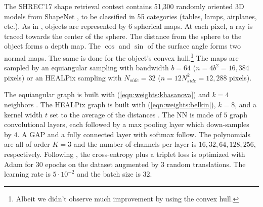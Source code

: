 \documentclass{article} %
\newcommand{\eqnref}[1]{(\ref{eqn:#1})}
\begin{document}
The SHREC'17 shape retrieval contest \citep{shrec17} contains 51,300 randomly oriented 3D models from ShapeNet \citep{shapenet}, to be classified in 55 categories (tables, lamps, airplanes, etc.).
As in \citep{cohen2018sphericalcnn}, objects are represented by 6 spherical maps.
At each pixel, a ray is traced towards the center of the sphere.
The distance from the sphere to the object forms a depth map.
The $\cos$ and $\sin$ of the surface angle forms two normal maps.
The same is done for the object's convex hull.\footnote{Albeit we didn't observe much improvement by using the convex hull.}
The maps are sampled by an equiangular sampling with bandwidth $b = 64$ ($n = 4 b^2 = 16,384$ pixels) or an HEALPix sampling with $N_{side} = 32$ ($n = 12 N_{side}^2 = 12,288$ pixels).

The equiangular graph is built with \eqnref{weights:khasanova} and $k = 4$ neighbors \citep[following][]{khasanova2017sphericalcnn}.
The HEALPix graph is built with \eqnref{weights:belkin}, $k = 8$, and a kernel width $t$ set to the average of the distances \citep[following][]{perraudin2019deepspherecosmo}.
The NN is made of $5$ graph convolutional layers, each followed by a max pooling layer which down-samples by $4$.
A GAP and a fully connected layer with softmax follow.
The polynomials are all of order $K=3$ and the number of channels per layer is $16, 32, 64, 128, 256$, respectively.
Following \citet{esteves2018sphericalcnn}, the cross-entropy plus a triplet loss is optimized with Adam for 30 epochs on the dataset augmented by 3 random translations.
The learning rate is $5 \cdot 10^{-2}$ and the batch size is 32.
\end{document}
